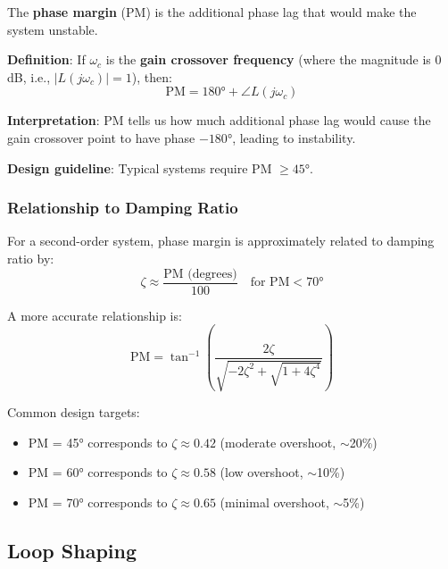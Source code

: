 The \textbf{phase margin} (PM) is the additional phase lag that would make the system unstable.

\textbf{Definition}: If $\omega_c$ is the \textbf{gain crossover frequency} (where the magnitude is 0 dB, i.e., $|L(j\omega_c)| = 1$), then:
\begin{equation}
\text{PM} = 180° + \angle L(j\omega_c)
\end{equation}

\textbf{Interpretation}: PM tells us how much additional phase lag would cause the gain crossover point to have phase $-180°$, leading to instability.

\textbf{Design guideline}: Typical systems require PM $\geq 45°$.

\subsubsection{Relationship to Damping Ratio}

For a second-order system, phase margin is approximately related to damping ratio by:
\begin{equation}
\zeta \approx \frac{\text{PM (degrees)}}{100} \quad \text{for } \text{PM} < 70°
\end{equation}

A more accurate relationship is:
\begin{equation}
\text{PM} = \tan^{-1}\left(\frac{2\zeta}{\sqrt{-2\zeta^2 + \sqrt{1 + 4\zeta^4}}}\right)
\end{equation}

Common design targets:
\begin{itemize}
    \item PM = 45° corresponds to $\zeta \approx 0.42$ (moderate overshoot, $\sim$20\%)
    \item PM = 60° corresponds to $\zeta \approx 0.58$ (low overshoot, $\sim$10\%)
    \item PM = 70° corresponds to $\zeta \approx 0.65$ (minimal overshoot, $\sim$5\%)
\end{itemize}


\subsection{Loop Shaping}
\label{subsec:loop_shaping}

